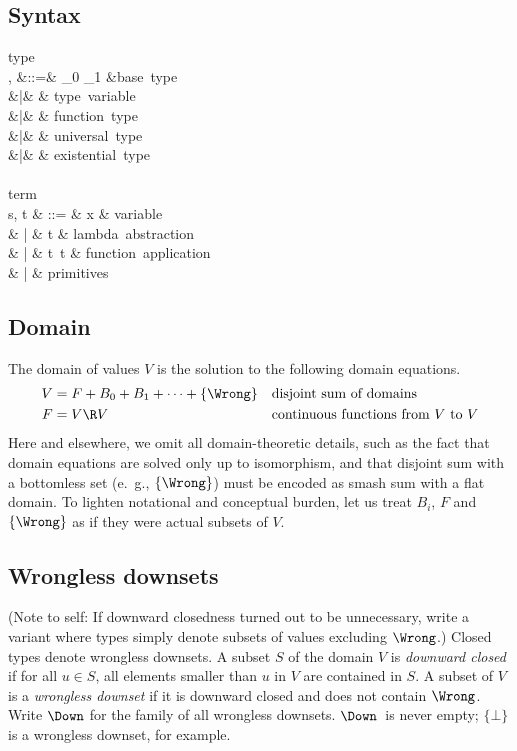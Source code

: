 \documentclass{amsart}
\theoremstyle{definition}
\begin{document}
\subsection{Syntax}
\begin{syntax}
\mbox{type}\\
\sigma, \tau
&::=& \iota_0 \Or \iota_1 \Or \cdots &\mbox{base type}\\
&|& \alpha \Or \beta \Or \cdots & \mbox{type variable} \\
&|& \tau \rightarrow \tau & \mbox{function type} \\
&|& \All\alpha\tau & \mbox{universal type} \\
&|& \Ex\alpha\tau & \mbox{existential type}
\\
\\
\mbox{term}\\
s, t & ::= & x & \mbox{variable} \\
& | & t  & \mbox{lambda abstraction} \\
& | & t~t & \mbox{function application} \\
& | & \mbox{primitives}
\end{syntax}

\subsection{Domain}
The domain of values $V$ is the solution to the following domain
equations.
\begin{align*}
V &= F + B_0 + B_1 + \cdots + \{\Wrong\}
  &&\mbox{disjoint sum of domains}\\
F &= V \R V &&\mbox{continuous functions from $V$ to $V$}
\end{align*}
Here and elsewhere, we omit all domain-theoretic details, such as
the fact that domain equations are solved only up to isomorphism,
and that disjoint sum with a bottomless set (e.~g., $\{\Wrong\}$)
must be encoded as smash sum with a flat domain. To lighten
notational and conceptual burden, let us treat $B_i$, $F$ and
$\{\Wrong\}$ as if they were actual subsets of $V$.

\subsection{Wrongless downsets}
\label{wrongless}
(Note to self: If downward closedness turned out to be
unnecessary, write a variant where types simply denote subsets of
values excluding $\Wrong$.) Closed types denote wrongless
downsets. A subset $S$ of the domain $V$ is \emph{downward
closed} if for all $u\in S$, all elements smaller than $u$ in $V$
are contained in $S$. A subset of $V$ is a \emph{wrongless
downset} if it is downward closed and does not contain $\Wrong$.
Write $\Down$ for the family of all wrongless downsets.
$\Down$~is never empty; $\{\bot\}$ is a wrongless downset, for
example.
\end{document}
